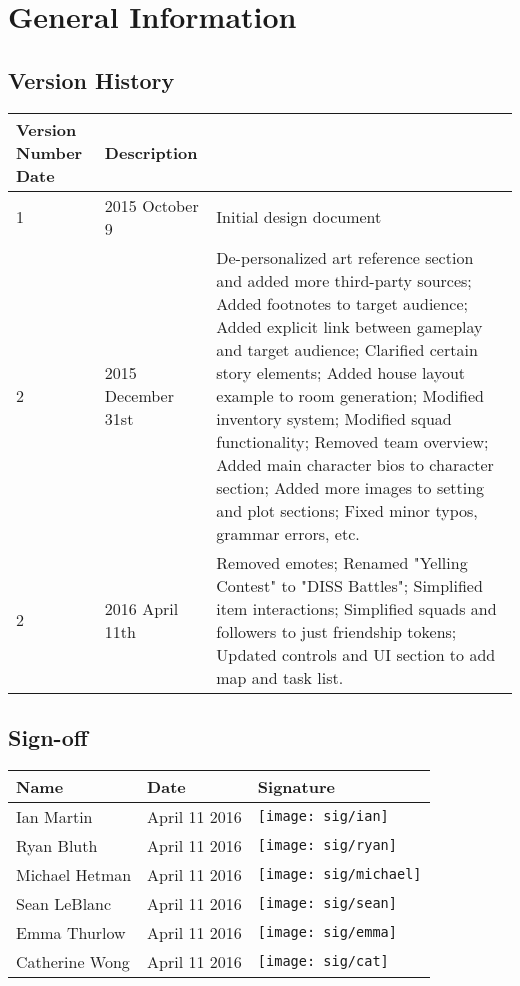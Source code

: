 \chapter{General Information}

\section{Version History}
\begin{tabular}{| p{} | p{} | p{} |}
\hline
Version Number 
Date & Description\\
\hline
1 & 2015 October 9 & Initial design document\\
\hline
2 & 2015 December 31st & De-personalized art reference section and added more third-party sources; Added footnotes to target audience; Added explicit link between gameplay and target audience; Clarified certain story elements; Added house layout example to room generation; Modified inventory system; Modified squad functionality; Removed team overview; Added main character bios to character section; Added more images to setting and plot sections; Fixed minor typos, grammar errors, etc.\\
\hline
2 & 2016 April 11th & Removed emotes; Renamed "Yelling Contest" to "DISS Battles"; Simplified item interactions; Simplified squads and followers to just friendship tokens; Updated controls and UI section to add map and task list.\\
\hline
\end{tabular}


\section{Sign-off}
\begin{tabular}{| p{} | p{} | p{} |}
  \hline
  Name & Date & Signature \\
  \hline
  Ian Martin & April 11 2016 & \texttt{[image: sig/ian]}\\
  \hline
  Ryan Bluth & April 11 2016 & \texttt{[image: sig/ryan]}\\
  \hline
  Michael Hetman & April 11 2016 & \texttt{[image: sig/michael]}\\
  \hline
  Sean LeBlanc & April 11 2016 & \texttt{[image: sig/sean]}\\
  \hline
  Emma Thurlow & April 11 2016 & \texttt{[image: sig/emma]}\\
  \hline
  Catherine Wong & April 11 2016 & \texttt{[image: sig/cat]}\\
  \hline
\end{tabular}
\setcounter{secnumdepth}{3}

\renewcommand*\contentsname{Table of Contents}

\tableofcontents
\listoffigures
